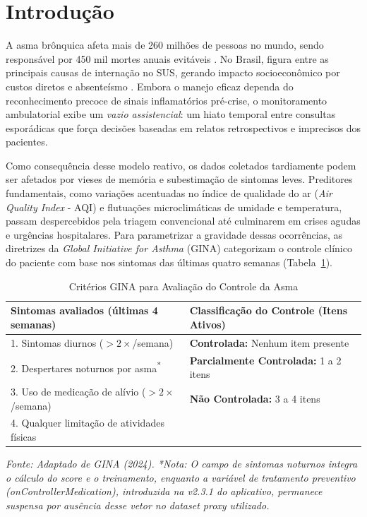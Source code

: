 \documentclass[12pt]{article}
\begin{document}
\section{Introdução} \label{sec:introducao}

A asma brônquica afeta mais de 260 milhões de pessoas no mundo, sendo responsável por 450 mil mortes anuais evitáveis \cite{ginasthma2024}. No Brasil, figura entre as principais causas de internação no SUS, gerando impacto socioeconômico por custos diretos e absenteísmo \cite{sbt2021}. Embora o manejo eficaz dependa do reconhecimento precoce de sinais inflamatórios pré-crise, o monitoramento ambulatorial exibe um \textit{vazio assistencial}: um hiato temporal entre consultas esporádicas que força decisões baseadas em relatos retrospectivos e imprecisos dos pacientes.

Como consequência desse modelo reativo, os dados coletados tardiamente podem ser afetados por vieses de memória e subestimação de sintomas leves. Preditores fundamentais, como variações acentuadas no índice de qualidade do ar (\textit{Air Quality Index} - AQI) e flutuações microclimáticas de umidade e temperatura, passam despercebidos pela triagem convencional até culminarem em crises agudas e urgências hospitalares. Para parametrizar a gravidade dessas ocorrências, as diretrizes da \textit{Global Initiative for Asthma} (GINA) categorizam o controle clínico do paciente com base nos sintomas das últimas quatro semanas (Tabela~\ref{tab:gina_criteria}).

\begin{table}[ht!]
\centering
\small
\caption{Critérios GINA para Avaliação do Controle da Asma}
\label{tab:gina_criteria}
\vskip 0.05in
\begin{tabular}{p{}p{}}
\hline
\textbf{Sintomas avaliados (últimas 4 semanas)} & \textbf{Classificação do Controle (Itens Ativos)} \\ \hline
1. Sintomas diurnos ($>2\times$/semana)          & \textbf{Controlada:} Nenhum item presente \\
2. Despertares noturnos por asma\textsuperscript{*} & \textbf{Parcialmente Controlada:} 1 a 2 itens \\
3. Uso de medicação de alívio ($>2\times$/semana) & \textbf{Não Controlada:} 3 a 4 itens \\
4. Qualquer limitação de atividades físicas      & \\ \hline
\end{tabular}
\vskip 0.05in
\begin{minipage}{\textwidth}
\footnotesize{\textit{Fonte: Adaptado de GINA (2024). *Nota: O campo de sintomas noturnos integra o cálculo do score e o treinamento, enquanto a variável de tratamento preventivo (\textit{onControllerMedication}), introduzida na v2.3.1 do aplicativo, permanece suspensa por ausência desse vetor no dataset proxy utilizado.}}
\end{minipage}
\end{table}
\end{document}
